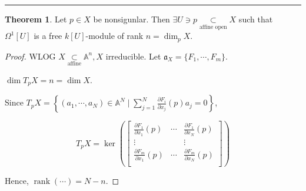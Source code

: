 \documentclass{article}
\theoremstyle{definition}
\newtheorem{theorem}{Theorem}
\begin{document}
    \hrule

    \begin{theorem}
        Let \(p\in X\) be nonsigunlar. Then \(\exists U\ni p \underset{\text{affine open}}{\subset} X\) such that \(\Omega^1[U]\) is a free \(k[U]\)-module of rank \(n = \dim_p X\).  
    \end{theorem}

    \begin{proof}
        WLOG \(X \underset{\text{affine}}{\subset} \mathbb{A}^n, X\) irreducible. Let \(\mathfrak{a}_X = \{ F_1, \cdots , F_m\} \).
        
        \(\dim T_p X = n = \dim X\).

        Since \(T_p X = \left\{ (a_1, \cdots , a_N) \in \mathbb{A}^N \mid \sum_{j=1}^N \frac{\partial F_i}{\partial x_j} (p) a_j = 0 \right\} \),

        \[
            T_p X = \ker \left( \begin{bmatrix}
                \frac{\partial F_1}{\partial x_1} (p) & \cdots & \frac{\partial F_1}{\partial x_N}(p) \\
                \vdots &  & \vdots \\
                \frac{\partial F_m}{\partial x_1}(p) & \cdots & \frac{\partial F_m}{\partial x_N}(p) \\
            \end{bmatrix}  \right) 
        \]

        Hence, \(\operatorname{rank} (\cdots) = N - n\). 
    \end{proof}
\end{document}
